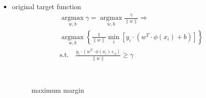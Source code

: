 \documentclass[oneside, 12pt]{ctexbook}
\begin{document}
\begin{enumerate}
\begin{itemize}
							\item original target function
								\begin{align}
								&	\mathop{\arg\max}\limits_{w, b} \gamma
									=    \mathop{\arg\max}\limits_{w, b} 		\frac{\hat{\gamma}}{\parallel w \parallel}
									\Rightarrow\\
								&	\mathop{\arg\max}\limits_{w,b}
									 \left\{
										\frac{1}{\parallel w \parallel} \min\limits_{i}
										\left[ 
											y_i \cdot (w^T \cdot \phi(x_i) + b) 
										\right]
									\right\}\\
									&\text{s.t.} \quad \frac{y_i \cdot (w^T \cdot \phi(x_i) +_b)}{\parallel w \parallel} \geq \gamma
								\end{align}
								\begin{figure}[H]
									\vspace{-0.3cm}  %
									\setlength{\abovecaptionskip}{-0.05cm}   %
									\centering
									\qquad
									\renewcommand{\figurename}{Fig} %
									\caption{maximum margin}
									\label{fig:12}
								\end{figure}
							

\end{itemize}
\end{enumerate}
\end{document}
